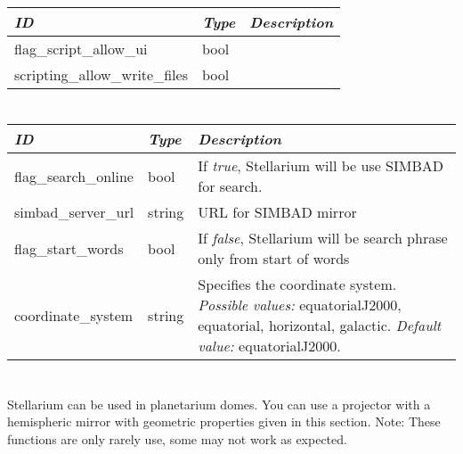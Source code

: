 \section{}\label{section-scripts}

\begin{longtabu} to \textwidth {l|l|X}
\toprule
\emph{ID} & \emph{Type} & \emph{Description}\\
\midrule
flag\_script\_allow\_ui & bool &\\
\midrule
scripting\_allow\_write\_files & bool &\\
\bottomrule
\end{longtabu}

\section{}\label{section-search}

\begin{longtabu} to \textwidth {l|l|X}
\toprule
\emph{ID} & \emph{Type} & \emph{Description}\\
\midrule
flag\_search\_online & bool & If \emph{true}, Stellarium will be use SIMBAD for search.\\
\midrule
simbad\_server\_url & string & URL for SIMBAD mirror\\
\midrule
flag\_start\_words & bool & If \emph{false}, Stellarium will be search phrase only from start of words\\
\midrule
coordinate\_system & string & Specifies the coordinate system. \emph{Possible values:} equatorialJ2000, equatorial, horizontal,
galactic. \emph{Default value:} equatorialJ2000.\\
\bottomrule
\end{longtabu}

\section{}\label{section-sphericux5fmirror}

Stellarium can be used in planetarium domes. You can use a projector with a hemispheric mirror with geometric properties given in this section. 
Note: These functions are only rarely use, some may not work as expected.
 
